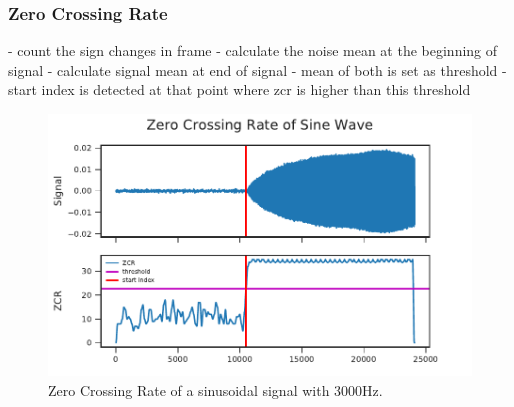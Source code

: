 
\subsubsection*{Zero Crossing Rate}

- count the sign changes in frame
- calculate the noise mean at the beginning of signal
- calculate signal mean at end of signal
- mean of both is set as threshold
- start index is detected at that point where zcr is higher than this threshold

\begin{figure}[ht]
	\centering
		\includegraphics[]{figures/sine_zcr}
	\caption{Zero Crossing Rate of a sinusoidal signal with 3000Hz.}
\end{figure}
\label{fig:03_zcr}